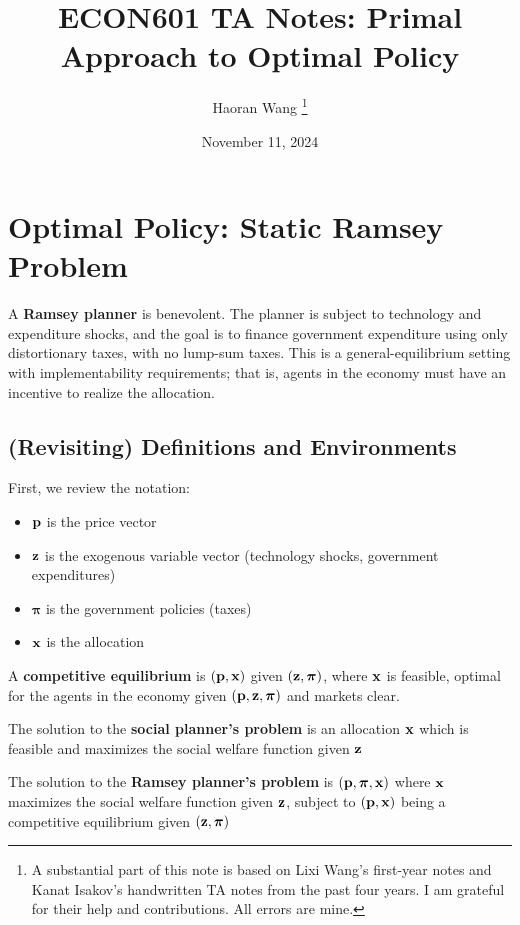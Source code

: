 \documentclass[12pt]{article}
\title{ECON601 TA Notes: Primal Approach to Optimal Policy}
\author{Haoran Wang \thanks{A substantial part of this note is based on Lixi Wang's first-year notes and Kanat Isakov's handwritten TA notes from the past four years. I am grateful for their help and contributions. All errors are mine.}}
\date{November 11, 2024}
\begin{document}
	\maketitle
	
	\tableofcontents
	
	\section{Optimal Policy: Static Ramsey Problem}
		A \textbf{Ramsey planner} is benevolent. The planner is subject to technology and expenditure shocks, and the goal is to finance government expenditure using only distortionary taxes, with no lump-sum taxes. This is a general-equilibrium setting with implementability requirements; that is, agents in the economy must have an incentive to realize the allocation.
	
	\subsection{(Revisiting) Definitions and Environments}
		First, we review the notation:
	\begin{itemize}
		\item $\bold{p}$ is the price vector
		\item $\bold{z}$ is the exogenous variable vector (technology shocks, government expenditures)
		\item $\boldsymbol{\pi}$ is the government policies (taxes)
		\item $\bold{x}$ is the allocation
	\end{itemize}
	
	\begin{definition}
		A \textbf{competitive equilibrium} is $(\bold{p}, \bold{x})$ given $(\bold{z}, \boldsymbol{\pi})$, where $\bold{x}$ is feasible, optimal for the agents in the economy given $(\bold{p}, \bold{z}, \boldsymbol{\pi})$ and markets clear.
	\end{definition}
	
	\begin{definition}
		The solution to the \textbf{social planner's problem} is an allocation $\bold{x}$ which is feasible and maximizes the social welfare function given $\bold{z}$
	\end{definition}
	
	\begin{definition}
		The solution to the \textbf{Ramsey planner's problem} is $(\bold{p}, \boldsymbol{\pi}, \bold{x})$ where $\bold{x}$ maximizes the social welfare function given $\bold{z}$, subject to $(\bold{p}, \bold{x})$ being a competitive equilibrium given $(\bold{z}, \boldsymbol{\pi})$
	\end{definition}
	
\end{document}
